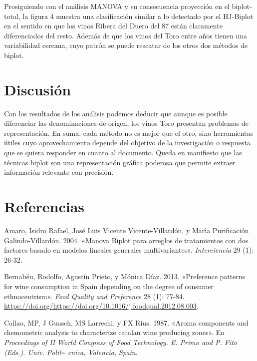 \documentclass[
  10pt,
  spanish,
]{article}
\begin{document}
Prosiguiendo con el análisis MANOVA y su consecuencia proyección en el
biplot-total, la figura 4 muestra una clasificación similar a lo
detectado por el HJ-Biplot en el sentido en que los vinos Ribera del
Duero del 87 están claramente diferenciados del resto. Además de que los
vinos del Toro entre años tienen una variabilidad cercana, cuyo patrón
se puede rescatar de los otros dos métodos de biplot.

\hypertarget{discusiuxf3n}{%
\section{Discusión}\label{discusiuxf3n}}

Con los resultados de los análisis podemos deducir que aunque es posible
diferenciar las denominaciones de origen, los vinos Toro presentan
problemas de representación. En suma, cada método no es mejor que el
otro, sino herramientas útiles cuyo aprovechamiento depende del objetivo
de la investigación o respuesta que se quiera responder en cuanto al
documento. Queda en manifiesto que las técnicas biplot son una
representación gráfica poderosa que permite extraer información
relevante con precisión.

\hypertarget{referencias}{%
\section*{Referencias}\label{referencias}}

\hypertarget{refs}{}
\leavevmode\hypertarget{ref-amaro2004}{}%
Amaro, Isidro Rafael, José Luis Vicente Vicente-Villardón, y Marı́a
Purificación Galindo-Villardón. 2004. «Manova Biplot para arreglos de
tratamientos con dos factores basado en modelos lineales generales
multivariantes». \emph{Interciencia} 29 (1): 26-32.

\leavevmode\hypertarget{ref-BERNABEU201377}{}%
Bernabéu, Rodolfo, Agustín Prieto, y Mónica Díaz. 2013. «Preference
patterns for wine consumption in Spain depending on the degree of
consumer ethnocentrism». \emph{Food Quality and Preference} 28 (1):
77-84.
\url{https://doi.org/https://doi.org/10.1016/j.foodqual.2012.08.003}.

\leavevmode\hypertarget{ref-callao1987}{}%
Callao, MP, J Guasch, MS Larrechi, y FX Rius. 1987. «Aroma components
and chemometric analysis to characterize catalan wine producing zones».
En \emph{Proceedings of II World Congress of Food Technology. E. Primo
and P. Fito (Eds.). Univ. Polit\textasciitilde{} cnica, Valencia,
Spain}.
\end{document}
